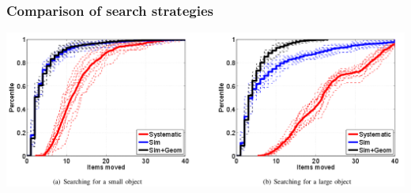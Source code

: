 \begin{frame}
  \frametitle{Comparison of search strategies}
  \includegraphics[width=\textwidth]{img/search-strategies.png}
\end{frame}

